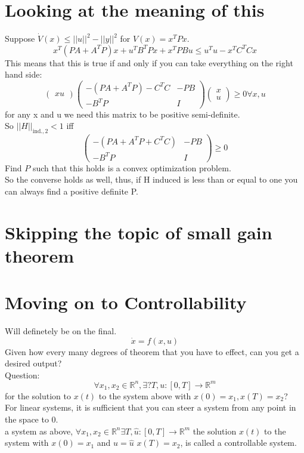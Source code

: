 \documentclass{article}
\begin{document}
\section{Looking at the meaning of this}
Suppose $\dot{V}(x)\leq \lvert\lvert u\rvert\rvert^2-\lvert\lvert y\rvert\rvert^2$ for $V(x)=x^TPx$.\\
\[x^T(PA+A^TP)x+u^TB^TPx+x^TPBu \leq u^Tu-x^TC^TCx\]
This means that this is true if and only if you can take everything on the right hand side:\\
\[\begin{pmatrix}x u\end{pmatrix}\begin{pmatrix}-(PA+A^TP)-C^TC & -PB\\-B^TP & I \end{pmatrix}\begin{pmatrix}x\\u\end{pmatrix}\geq 0 \forall x,u\]
for any x and u we need this matrix to be positive semi-definite.\\
So $\lvert\lvert H\rvert\rvert_{\text{ind.},2} <1$ iff\\
\[\begin{pmatrix}-(PA+A^TP+C^TC) & -PB\\-B^TP & I\end{pmatrix}\geq 0\]
Find $P$ such that this holds is a convex optimization problem.\\
So the converse holds as well, thus, if H induced is less than or equal to one you can always find a positive definite P.\\

\section{Skipping the topic of small gain theorem}

\section{Moving on to Controllability}
Will definetely be on the final.\\
\[\dot{x}=f(x,u)\]
Given how every many degrees of theorem that you have to effect, can you get a desired output?\\
Question:\\
\[\forall x_1,x_2\in\mathbb{R}^n,\exists ? T, u:[0,T]\to\mathbb{R}^m\]
for the solution to $x(t)$ to the system above with $x(0)=x_1,x(T)=x_2$?\\
For linear systems, it is sufficient that you can steer a system from any point in the space to 0.\\
a system as above, $\forall x_1,x_2\in\mathbb{R}^n \exists T,\hat{u}:[0,T]\to\mathbb{R}^m$ the solution $x(t)$ to the system with $x(0)=x_1$ and $u=\hat{u}$ $x(T)=x_2$, is called a controllable system.\\
\end{document}
